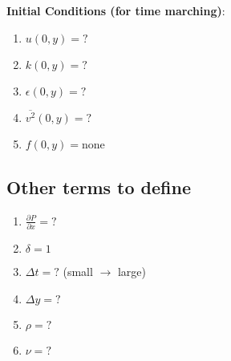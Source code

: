 \documentclass[12pt]{article}
\newcommand{\ep}{\epsilon} \newcommand{\noi}{\noindent}
\newcommand{\pr}{\partial}
\begin{document}
\noi \textbf{Initial Conditions (for time marching)}: 
\begin{enumerate}
	\item $u(0,y) = ?$
	\item $k(0,y) = ?$ 
	\item $\ep(0,y) = ?$ 
	\item $\overline{v^2}(0,y) = ?$
	\item $f(0,y) = $none 
\end{enumerate}

\subsection{Other terms to define} 

\begin{enumerate}
	\item $\frac{\pr P}{\pr x} = ?$
	\item $\delta = 1$
	\item $\Delta t = ?$  (small $\rightarrow$ large)
	\item $\Delta y = ?$ 
	\item $\rho = ?$
	\item $\nu = ?$
\end{enumerate}
\end{document}
